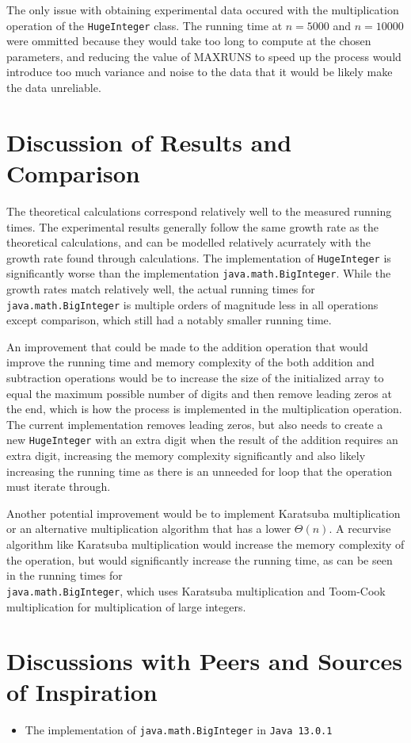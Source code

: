 \documentclass[12pt]{article}
\newcommand{\code}[1]{\texttt{#1}}
\begin{document}
\pagebreak
The only issue with obtaining experimental data occured with the multiplication operation of the \code{HugeInteger} class. The running time at $n=5000$ and $n=10000$ were ommitted because they would take too long to compute at the chosen parameters, and reducing the value of MAXRUNS to speed up the process would introduce too much variance and noise to the data that it would be likely make the data unreliable.

\section*{Discussion of Results and Comparison}
The theoretical calculations correspond relatively well to the measured running times. The experimental results generally follow the same growth rate as the theoretical calculations, and can be modelled relatively acurrately with the growth rate found through calculations. The implementation of \code{HugeInteger} is significantly worse than the implementation \code{java.math.BigInteger}. While the growth rates match relatively well, the actual running times for \code{java.math.BigInteger} is multiple orders of magnitude less in all operations except comparison, which still had a notably smaller running time.

An improvement that could be made to the addition operation that would improve the running time and memory complexity of the both addition and subtraction operations would be to increase the size of the initialized array to equal the maximum possible number of digits and then remove leading zeros at the end, which is how the process is implemented in the multiplication operation. The current implementation removes leading zeros, but also needs to create a new \code{HugeInteger} with an extra digit when the result of the addition requires an extra digit, increasing the memory complexity significantly and also likely increasing the running time as there is an unneeded for loop that the operation must iterate through.

Another potential improvement would be to implement Karatsuba multiplication or an alternative multiplication algorithm that has a lower $\Theta(n)$. A recurvise algorithm like Karatsuba multiplication would increase the memory complexity of the operation, but would significantly increase the running time, as can be seen in the running times for \\ \code{java.math.BigInteger}, which uses Karatsuba multiplication and Toom-Cook multiplication for multiplication of large integers.

\section*{Discussions with Peers and Sources of Inspiration}
\begin{itemize}
    \item The implementation of \code{java.math.BigInteger} in \code{Java 13.0.1}
\end{itemize}
\end{document}
